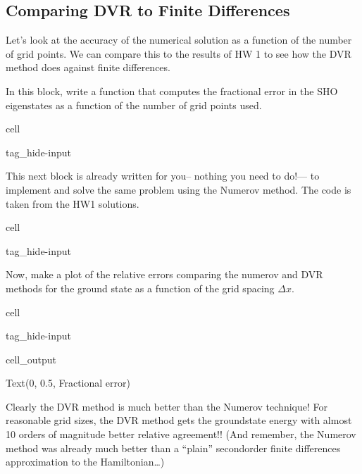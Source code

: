 \documentclass[letterpaper,10pt,english]{jupyterBook}
\begin{document}
\subsection{Comparing DVR to Finite Differences}
\label{\detokenize{Section4_v2:comparing-dvr-to-finite-differences}}
\sphinxAtStartPar
Let’s look at the accuracy of the numerical solution as a function of the number of grid points. We can compare this to the results of HW 1 to see how the DVR method does against finite differences.

\sphinxAtStartPar
In this block, write a function that computes the fractional error in the SHO eigenstates as a function of the number of grid points used.

\begin{sphinxuseclass}{cell}
\begin{sphinxuseclass}{tag_hide-input}
\end{sphinxuseclass}
\end{sphinxuseclass}
\sphinxAtStartPar
This next block is already written for you– nothing you need to do!— to implement and solve the same problem using the Numerov method. The code is taken from the HW1 solutions.

\begin{sphinxuseclass}{cell}
\begin{sphinxuseclass}{tag_hide-input}
\end{sphinxuseclass}
\end{sphinxuseclass}
\sphinxAtStartPar
Now, make a plot of the relative errors comparing the numerov and DVR methods for the ground state as a function of the grid spacing \(\Delta x\).

\begin{sphinxuseclass}{cell}
\begin{sphinxuseclass}{tag_hide-input}\begin{sphinxVerbatimOutput}

\begin{sphinxuseclass}{cell_output}
\begin{sphinxVerbatim}[commandchars=\\\{\}]
Text(0, 0.5, \PYGZsq{}Fractional error\PYGZsq{})
\end{sphinxVerbatim}

\noindent{}

\end{sphinxuseclass}\end{sphinxVerbatimOutput}

\end{sphinxuseclass}
\end{sphinxuseclass}
\sphinxAtStartPar
Clearly the DVR method is much better than the Numerov technique! For reasonable grid sizes, the DVR method gets the ground\sphinxhyphen{}state energy with almost 10 orders of magnitude better relative agreement!! (And remember, the Numerov method was already much better than a “plain” second\sphinxhyphen{}order finite differences approximation to the Hamiltonian…)
\end{document}
